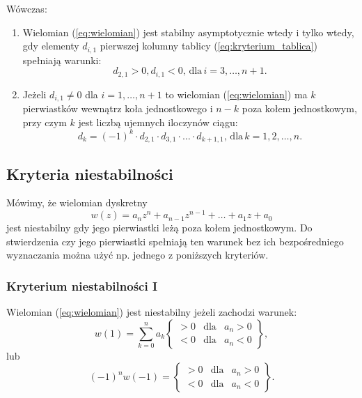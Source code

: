\documentclass{article}
\begin{document}
        Wówczas:
        \begin{enumerate}
            \item Wielomian (\ref{eq:wielomian}) jest stabilny asymptotycznie wtedy i tylko wtedy, gdy elementy $d_{i,1}$ pierwszej kolumny tablicy (\ref{eq:kryterium_tablica}) spełniają warunki:
            $$
                d_{2, 1} > 0, d_{i,1} < 0,\, \text{dla}\,i = 3, \dots, n+1.
            $$

            \item Jeżeli $d_{i,1} \neq 0$ dla $i=1, \dots, n+1$ to wielomian (\ref{eq:wielomian}) ma $k$ pierwiastków wewnątrz koła jednostkowego i $n-k$ poza kołem jednostkowym, przy czym $k$ jest liczbą ujemnych iloczynów ciągu:
            $$
                d_{k} = (-1)^{k} \cdot d_{2,1} \cdot d_{3,1} \cdot \dots \cdot d_{k+1, 1}, \, \text{dla}\, k = 1, 2, \dots, n.
            $$
        \end{enumerate}

    \subsection{Kryteria niestabilności}
    Mówimy, że wielomian dyskretny
    $$
        w(z) = a_{n}z^n + a_{n-1}z^{n-1} + \dots + a_{1}z + a_{0}
    $$
    jest niestabilny gdy jego pierwiastki leżą poza kołem jednostkowym.
    Do stwierdzenia czy jego pierwiastki spełniają ten warunek bez ich bezpośredniego wyznaczania można użyć np. jednego z poniższych kryteriów.

        \subsubsection{Kryterium niestabilności I}
        Wielomian (\ref{eq:wielomian}) jest niestabilny jeżeli zachodzi warunek:
        $$
            w(1) = \sum_{k=0}^{n}{a_{k}}
            \left\{
            \begin{array}{ccl}
                > 0 & \text{dla}    &   a_{n} > 0\\
                < 0 & \text{dla}    &   a_{n} < 0
            \end{array}
            \right\},
        $$
        lub
        $$
            (-1)^{n}w(-1) =
            \left\{
            \begin{array}{ccl}
                > 0 & \text{dla}    &   a_{n} > 0\\
                < 0 & \text{dla}    &   a_{n} < 0
            \end{array}
            \right\}.
        $$
\end{document}
